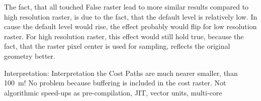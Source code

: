 The fact, that all touched False raster lead to more similar results compared to high resolution raster, is due to the fact, that the default level is relatively low.
In cause the default level would rise, the effect probably would flip for low resolution raster.
For high resolution raster, this effect would still hold true, because the fact, that the raster pixel center is used for sampling, reflects the original geometry better.


Interpretation: Interpretation the Cost Paths are much nearer smaller, than 100~m!
No problem because buffering is included in the cost raster.
Not algorithmic speed-ups as pre-compilation, JIT, vector units, multi-core